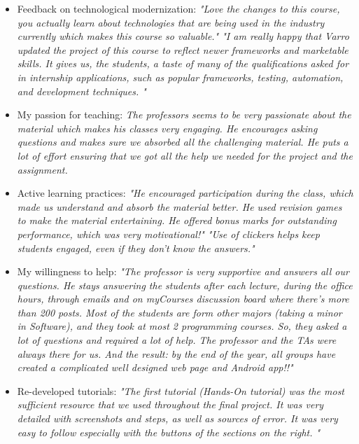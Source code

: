 \begin{itemize}[leftmargin=0.5cm]
\item Feedback on technological modernization: \emph{ "Love the changes to this course, you actually learn about technologies that are being used in the industry currently which makes this course so valuable." "I am really happy that Varro updated the project of this course to reflect newer frameworks and marketable skills. It gives us, the students, a taste of many of the qualifications asked for in internship applications, such as popular frameworks, testing, automation, and development techniques. "}
\item My passion for teaching: \emph{The professors seems to be very passionate about the material which makes his classes very engaging. He encourages asking questions and makes sure we absorbed all the challenging material. He puts a lot of effort ensuring that we got all the help we needed for the project and the assignment.}
\item Active learning practices: \emph{"He encouraged participation during the class, which made us understand and absorb the material better. He used revision games to make the material entertaining. He offered bonus marks for outstanding performance, which was very motivational!" "Use of clickers helps keep students engaged, even if they don't know the answers."}
\item My willingness to help: \emph{"The professor is very supportive and answers all our questions. He stays answering the students after each lecture, during the office hours, through emails and on myCourses discussion board where there's more than 200 posts. Most of the students are form other majors (taking a minor in Software), and they took at most 2 programming courses. So, they asked a lot of questions and required a lot of help. The professor and the TAs were always there for us. And the result: by the end of the year, all groups have created a complicated well designed web page and Android app!!" }
\item Re-developed tutorials: \emph{"The first tutorial (Hands-On tutorial) was the most sufficient resource that we used throughout the final project. It was very detailed with screenshots and steps, as well as sources of error. It was very easy to follow especially with the buttons of the sections on the right. "}
\end{itemize}

